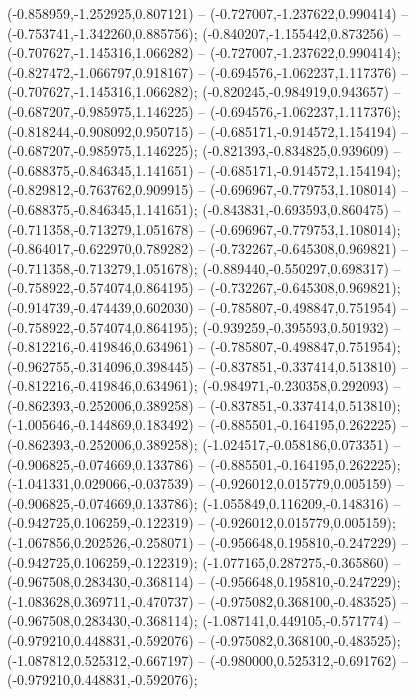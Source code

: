  (-0.858959,-1.252925,0.807121) -- (-0.727007,-1.237622,0.990414) -- (-0.753741,-1.342260,0.885756);
 (-0.840207,-1.155442,0.873256) -- (-0.707627,-1.145316,1.066282) -- (-0.727007,-1.237622,0.990414);
 (-0.827472,-1.066797,0.918167) -- (-0.694576,-1.062237,1.117376) -- (-0.707627,-1.145316,1.066282);
 (-0.820245,-0.984919,0.943657) -- (-0.687207,-0.985975,1.146225) -- (-0.694576,-1.062237,1.117376);
 (-0.818244,-0.908092,0.950715) -- (-0.685171,-0.914572,1.154194) -- (-0.687207,-0.985975,1.146225);
 (-0.821393,-0.834825,0.939609) -- (-0.688375,-0.846345,1.141651) -- (-0.685171,-0.914572,1.154194);
 (-0.829812,-0.763762,0.909915) -- (-0.696967,-0.779753,1.108014) -- (-0.688375,-0.846345,1.141651);
 (-0.843831,-0.693593,0.860475) -- (-0.711358,-0.713279,1.051678) -- (-0.696967,-0.779753,1.108014);
 (-0.864017,-0.622970,0.789282) -- (-0.732267,-0.645308,0.969821) -- (-0.711358,-0.713279,1.051678);
 (-0.889440,-0.550297,0.698317) -- (-0.758922,-0.574074,0.864195) -- (-0.732267,-0.645308,0.969821);
 (-0.914739,-0.474439,0.602030) -- (-0.785807,-0.498847,0.751954) -- (-0.758922,-0.574074,0.864195);
 (-0.939259,-0.395593,0.501932) -- (-0.812216,-0.419846,0.634961) -- (-0.785807,-0.498847,0.751954);
 (-0.962755,-0.314096,0.398445) -- (-0.837851,-0.337414,0.513810) -- (-0.812216,-0.419846,0.634961);
 (-0.984971,-0.230358,0.292093) -- (-0.862393,-0.252006,0.389258) -- (-0.837851,-0.337414,0.513810);
 (-1.005646,-0.144869,0.183492) -- (-0.885501,-0.164195,0.262225) -- (-0.862393,-0.252006,0.389258);
 (-1.024517,-0.058186,0.073351) -- (-0.906825,-0.074669,0.133786) -- (-0.885501,-0.164195,0.262225);
 (-1.041331,0.029066,-0.037539) -- (-0.926012,0.015779,0.005159) -- (-0.906825,-0.074669,0.133786);
 (-1.055849,0.116209,-0.148316) -- (-0.942725,0.106259,-0.122319) -- (-0.926012,0.015779,0.005159);
 (-1.067856,0.202526,-0.258071) -- (-0.956648,0.195810,-0.247229) -- (-0.942725,0.106259,-0.122319);
 (-1.077165,0.287275,-0.365860) -- (-0.967508,0.283430,-0.368114) -- (-0.956648,0.195810,-0.247229);
 (-1.083628,0.369711,-0.470737) -- (-0.975082,0.368100,-0.483525) -- (-0.967508,0.283430,-0.368114);
 (-1.087141,0.449105,-0.571774) -- (-0.979210,0.448831,-0.592076) -- (-0.975082,0.368100,-0.483525);
 (-1.087812,0.525312,-0.667197) -- (-0.980000,0.525312,-0.691762) -- (-0.979210,0.448831,-0.592076);
